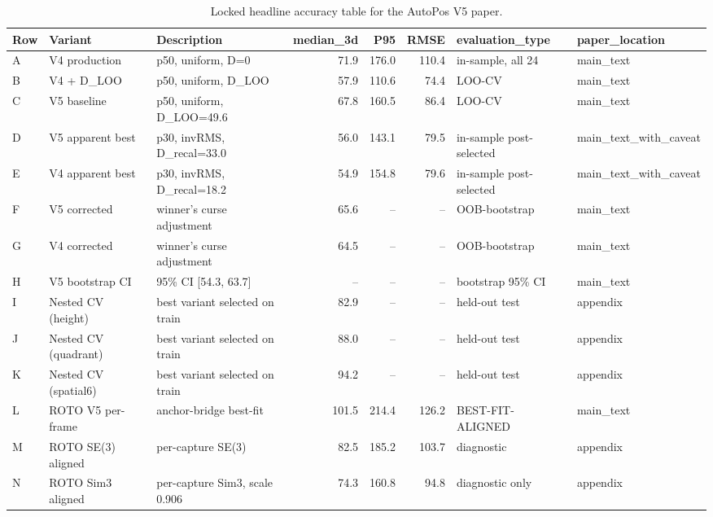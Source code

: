 \begin{table}[t]
\centering
\small
\begin{tabular}{lllrrrll}
\hline
Row & Variant & Description & median\_3d & P95 & RMSE & evaluation\_type & paper\_location \\
\hline
A & V4 production & p50, uniform, D=0 & 71.9 & 176.0 & 110.4 & in-sample, all 24 & main\_text \\
B & V4 + D\_LOO & p50, uniform, D\_LOO & 57.9 & 110.6 & 74.4 & LOO-CV & main\_text \\
C & V5 baseline & p50, uniform, D\_LOO=49.6 & 67.8 & 160.5 & 86.4 & LOO-CV & main\_text \\
D & V5 apparent best & p30, invRMS, D\_recal=33.0 & 56.0 & 143.1 & 79.5 & in-sample post-selected & main\_text\_with\_caveat \\
E & V4 apparent best & p30, invRMS, D\_recal=18.2 & 54.9 & 154.8 & 79.6 & in-sample post-selected & main\_text\_with\_caveat \\
F & V5 corrected & winner's curse adjustment & 65.6 & -- & -- & OOB-bootstrap & main\_text \\
G & V4 corrected & winner's curse adjustment & 64.5 & -- & -- & OOB-bootstrap & main\_text \\
H & V5 bootstrap CI & 95\% CI [54.3, 63.7] & -- & -- & -- & bootstrap 95\% CI & main\_text \\
I & Nested CV (height) & best variant selected on train & 82.9 & -- & -- & held-out test & appendix \\
J & Nested CV (quadrant) & best variant selected on train & 88.0 & -- & -- & held-out test & appendix \\
K & Nested CV (spatial6) & best variant selected on train & 94.2 & -- & -- & held-out test & appendix \\
L & ROTO V5 per-frame & anchor-bridge best-fit & 101.5 & 214.4 & 126.2 & BEST-FIT-ALIGNED & main\_text \\
M & ROTO SE(3) aligned & per-capture SE(3) & 82.5 & 185.2 & 103.7 & diagnostic & appendix \\
N & ROTO Sim3 aligned & per-capture Sim3, scale 0.906 & 74.3 & 160.8 & 94.8 & diagnostic only & appendix \\
\hline
\end{tabular}
\caption{Locked headline accuracy table for the AutoPos V5 paper.}
\label{tab:locked_headline}
\end{table}
